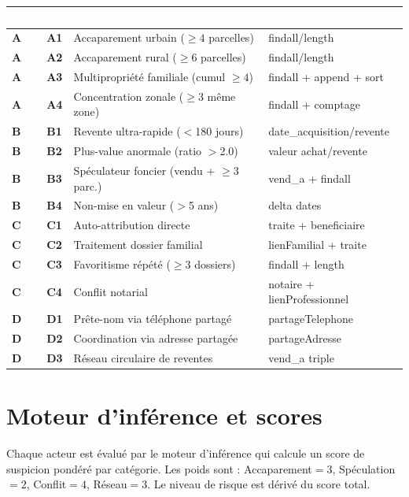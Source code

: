 \documentclass[11pt,a4paper]{report}
\begin{document}
\begin{longtable}{>{\bfseries}p{0.8cm} >{\bfseries}p{0.8cm} p{6.5cm} p{5.5cm}}
\toprule
\rowcolor{tablehead}\textcolor{white}{Cat.} & \textcolor{white}{ID} & \textcolor{white}{Description} & \textcolor{white}{Mécanisme} \\
\midrule
\endhead
A & A1 & Accaparement urbain ($\geq 4$ parcelles) & findall/length \\
A & A2 & Accaparement rural ($\geq 6$ parcelles)  & findall/length \\
A & A3 & Multipropriété familiale (cumul $\geq 4$) & findall + append + sort \\
A & A4 & Concentration zonale ($\geq 3$ même zone) & findall + comptage \\
B & B1 & Revente ultra-rapide ($<$180 jours) & date\_acquisition/revente \\
B & B2 & Plus-value anormale (ratio $>$2.0) & valeur achat/revente \\
B & B3 & Spéculateur foncier (vendu + $\geq3$ parc.) & vend\_a + findall \\
B & B4 & Non-mise en valeur ($>$5 ans) & delta dates \\
C & C1 & Auto-attribution directe & traite + beneficiaire \\
C & C2 & Traitement dossier familial & lienFamilial + traite \\
C & C3 & Favoritisme répété ($\geq3$ dossiers) & findall + length \\
C & C4 & Conflit notarial & notaire + lienProfessionnel \\
D & D1 & Prête-nom via téléphone partagé & partageTelephone \\
D & D2 & Coordination via adresse partagée & partageAdresse \\
D & D3 & Réseau circulaire de reventes & vend\_a triple \\
\bottomrule
\end{longtable}

\section{Moteur d'inférence et scores}

Chaque acteur est évalué par le moteur d'inférence qui calcule un score de suspicion
pondéré par catégorie. Les poids sont : Accaparement$=3$, Spéculation$=2$,
Conflit$=4$, Réseau$=3$. Le niveau de risque est dérivé du score total.
\end{document}
